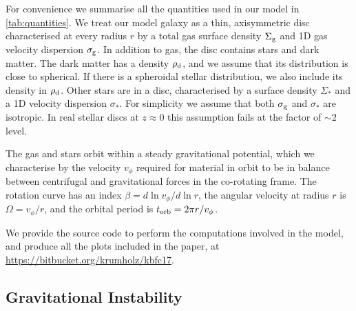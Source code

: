 \documentclass[useAMS,usenatbib]{mn2e}
\begin{document}
For convenience we summarise all the quantities used in our model in \autoref{tab:quantities}. We treat our model galaxy as a thin, axisymmetric disc characterised at every radius $r$ by a total gas surface density $\Sigma_{\rm g}$ and 1D gas velocity dispersion $\sigma_{\rm g}$. In addition to gas, the disc contains stars and dark matter. The dark matter has a density $\rho_{\rm d}$, and we assume that its distribution is close to spherical. If there is a spheroidal stellar distribution, we also include its density in $\rho_{\rm d}$. Other stars are in a disc, characterised by a surface density $\Sigma_*$ and a 1D velocity dispersion $\sigma_*$. For simplicity we assume that both $\sigma_{\rm g}$ and $\sigma_*$ are isotropic. In real stellar discs at $z\approx 0$ this assumption fails at the factor of $\sim 2$ level.

The gas and stars orbit within a steady gravitational potential, which we characterise by the velocity $v_\phi$ required for material in orbit to be in balance between centrifugal and gravitational forces in the co-rotating frame. The rotation curve has an index $\beta = d\ln v_\phi /d\ln r$, the angular velocity at radius $r$ is $\Omega = v_\phi/r$, and the orbital period is $t_{\rm orb} = 2 \pi r/v_\phi$.

We provide the source code to perform the computations involved in the model, and produce all the plots included in the paper, at \url{https://bitbucket.org/krumholz/kbfc17}.


\subsection{Gravitational Instability}
\end{document}
